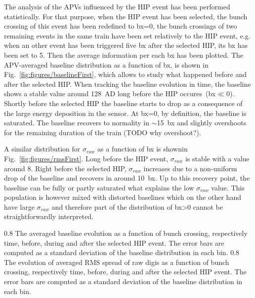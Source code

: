 The analysis of the APVs influenced by the HIP event has been performed statistically. For that purpose, when the HIP event has been selected, the bunch crossing of this event has been redefined to bx=0, the bunch crossings of two remaining events in the same train have been set relatively to the HIP event, e.g. when an other event has been triggered five bx after the selected HIP, its bx has been set to 5. Then the average information per each bx has been plotted. The APV-averaged baseline distribution as a function of bx, is shown in Fig.~\ref{fig:figures/baselineFirst}, which allows to study what happened before and after the selected HIP. When tracking the baseline evolution in time, the baseline shows a stable value around 128~AD long before the HIP occures~(bx$\ll$0). Shortly before the selected HIP the baseline starts to drop as a consequence of the large energy deposition in the sensor. At bx=0, by definition, the baseline is saturated. The baseline recovers to normality in $\sim$15~bx and slightly overshoots for the remaining duration of the train (TODO why overshoot?).

A similar distribution for $\sigma_{raw}$  as a function of bx is shownin Fig.~\ref{fig:figures/rmsFirst}. Long before the HIP event, $\sigma_{raw}$ is stable with a value around 8. Right before the selected HIP, $\sigma_{raw}$ increases due to a non-uniform drop of the baseline and recovers in around 10~bx. Up to this recovery point, the baseline can be fully or partly saturated what explains the low $\sigma_{raw}$ value. This population is however mixed with distorted baselines which on the other hand have large $\sigma_{raw}$ and therefore part of the distribution of bx>0 cannot be straightforwardly interpreted.


                 {0.8}       %
                 {The averaged baseline evolution as a function of bunch crossing, respectively time, before, during and after the selected HIP event. The error bars are computed as a standard deviation of the baseline distribution in each bin.  } %
                 {0.8}       %
                 {The evolution of averaged RMS spread of raw digis as a function of bunch crossing, respectively time, before, during and after the selected HIP event. The error bars are computed as a standard deviation of the baseline distribution in each bin.  } %



